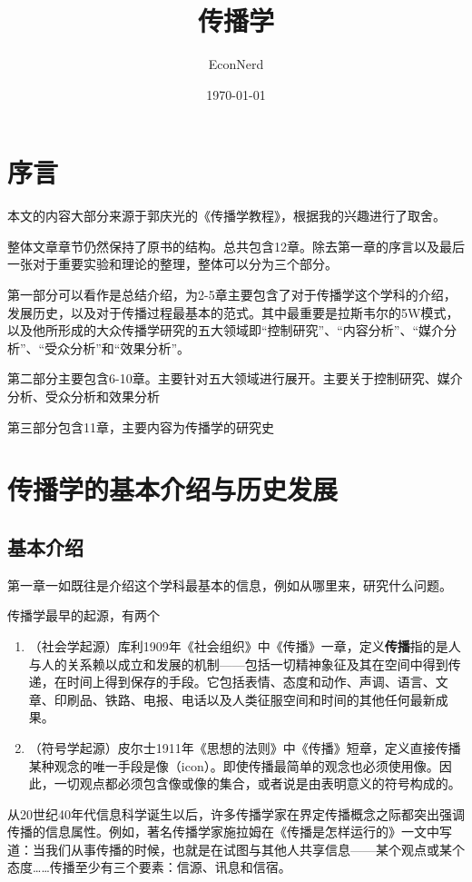\documentclass[UTF8,12pt]{ctexart}
\title{传播学} %
\author{EconNerd}
\date{\today}
\numberwithin{equation}{section} %
\numberwithin{figure}{section}
\numberwithin{table}{section}
\begin{document}
	\maketitle
	\tableofcontents
	\newpage
	
	\section{序言}
	本文的内容大部分来源于郭庆光的《传播学教程》，根据我的兴趣进行了取舍。
	
	整体文章章节仍然保持了原书的结构。总共包含12章。除去第一章的序言以及最后一张对于重要实验和理论的整理，整体可以分为三个部分。
	
	第一部分可以看作是总结介绍，为2-5章主要包含了对于传播学这个学科的介绍，发展历史，以及对于传播过程最基本的范式。其中最重要是拉斯韦尔的5W模式，以及他所形成的大众传播学研究的五大领域即“控制研究”、“内容分析”、“媒介分析”、“受众分析”和“效果分析”。
	
	第二部分主要包含6-10章。主要针对五大领域进行展开。主要关于控制研究、媒介分析、受众分析和效果分析
	
	第三部分包含11章，主要内容为传播学的研究史
	
	\section{传播学的基本介绍与历史发展}
	\subsection{基本介绍}
	第一章一如既往是介绍这个学科最基本的信息，例如从哪里来，研究什么问题。
	
	传播学最早的起源，有两个
	\begin{enumerate}
		\item （社会学起源）库利1909年《社会组织》中《传播》一章，定义\textbf{传播}指的是人与人的关系赖以成立和发展的机制——包括一切精神象征及其在空间中得到传递，在时间上得到保存的手段。它包括表情、态度和动作、声调、语言、文章、印刷品、铁路、电报、电话以及人类征服空间和时间的其他任何最新成果。
		
		\item （符号学起源）皮尔士1911年《思想的法则》中《传播》短章，定义直接传播某种观念的唯一手段是像（icon）。即使传播最简单的观念也必须使用像。因此，一切观点都必须包含像或像的集合，或者说是由表明意义的符号构成的。
	\end{enumerate}
	
	从20世纪40年代信息科学诞生以后，许多传播学家在界定传播概念之际都突出强调传播的信息属性。例如，著名传播学家施拉姆在《传播是怎样运行的》一文中写道：当我们从事传播的时候，也就是在试图与其他人共享信息——某个观点或某个态度……传播至少有三个要素：信源、讯息和信宿。
	
\end{document}
